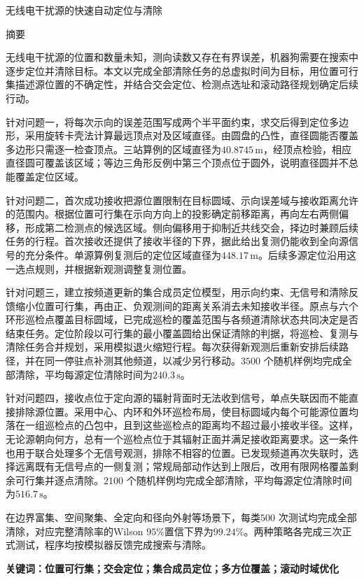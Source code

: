 \begin{center}
  {\heiti 无线电干扰源的快速自动定位与清除\par}
  \vspace{0.8em}
  {\heiti 摘\quad 要}
\end{center}

无线电干扰源的位置和数量未知，测向读数又存在有界误差，机器狗需要在搜索中逐步定位并清除目标。本文以完成全部清除任务的总虚拟时间为目标，用位置可行集描述源位置的不确定性，并结合交会定位、检测点选址和滚动路径规划确定后续行动。

针对问题一，将每次示向的误差范围写成两个半平面约束，求交后得到定位多边形，采用旋转卡壳法计算最远顶点对及区域直径。由圆盘的凸性，直径圆能否覆盖多边形只需逐一检查顶点。三站算例的区域直径为\(40.8745\,\mathrm{m}\)，经顶点检验，相应直径圆可覆盖该区域；等边三角形反例中第三个顶点位于圆外，说明直径圆并不总能覆盖定位区域。

针对问题二，首次成功接收把源位置限制在目标圆域、示向误差域与接收距离允许的范围内。根据位置可行集在示向方向上的投影确定前移距离，再向左右两侧偏移，形成第二检测点的候选区域。侧向偏移用于抑制近共线交会，择边时兼顾后续任务的行程。首次接收还提供了接收半径的下界，据此给出复测仍能收到全向源信号的充分条件。单源算例复测后的定位区域直径为\(448.17\,\mathrm{m}\)。后续多源定位沿用这一选点规则，并根据新观测调整复测位置。

针对问题三，建立按频道更新的集合成员定位模型，用示向约束、无信号和清除反馈缩小位置可行集，再由正、负观测间的距离关系消去未知接收半径。原点与六个环形巡检点覆盖目标圆域，已完成巡检的覆盖范围与各频道清除状态共同决定是否结束任务。定位阶段以可行集的最小覆盖圆给出保证清除的判据，将巡检、复测与清除任务合并规划，采用模拟退火缩短行程。每次获得新观测后重新安排后续路径，并在同一停驻点补测其他频道，以减少另行移动。\(3500\) 个随机样例均完成全部清除，平均每源定位清除时间为\(240.3\,\mathrm{s}\)。

针对问题四，接收点位于定向源的辐射背面时无法收到信号，单点失联因而不能直接排除源位置。采用中心、内环和外环巡检布局，使目标圆域内每个可能源位置均落在一组巡检点的凸包中，且到这些巡检点的距离均不超过最小接收半径。这样，无论源朝向何方，总有一个巡检点位于其辐射正面并满足接收距离要求。这一条件也用于联合处理多个无信号观测，排除不相容的位置。已发现频道再次失联时，选择远离既有无信号点的一侧复测；常规局部动作达到上限后，改用有限网格覆盖剩余可行集并逐点清除。\(2100\) 个随机样例均完成全部清除，平均每源定位清除时间为\(516.7\,\mathrm{s}\)。

在边界富集、空间聚集、全定向和径向外射等场景下，每类\(500\) 次测试均完成全部清除，对应完整清除率的Wilson \(95\%\)置信下界为\(99.24\%\)。两种策略各完成三次正式测试，程序均按模拟器反馈完成搜索与清除。

\vspace{1em}
\noindent\textbf{关键词：}\textbf{位置可行集；交会定位；集合成员定位；多方位覆盖；滚动时域优化}
